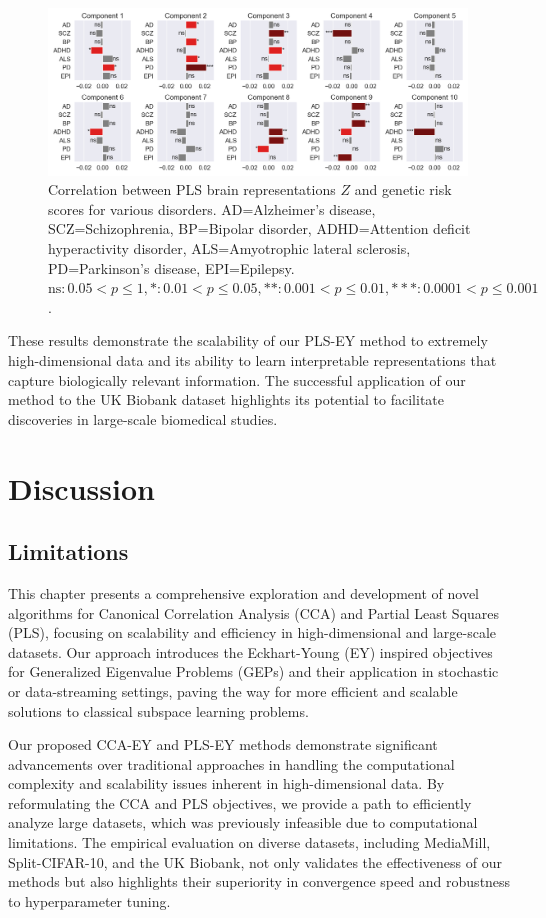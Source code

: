 \begin{figure}
\centering
\includegraphics[width=0.99\textwidth,trim={0.5cm 0cm 0.7cm 0cm}]{figures/UKBB/prs_correlations.png}
\caption{Correlation between PLS brain representations $Z$ and genetic risk scores for various disorders. AD=Alzheimer's disease, SCZ=Schizophrenia, BP=Bipolar disorder, ADHD=Attention deficit hyperactivity disorder, ALS=Amyotrophic lateral sclerosis, PD=Parkinson's disease, EPI=Epilepsy. $\text{ns}: 0.05 < p \leq 1, \ast: 0.01 < p \leq 0.05, \ast\ast: 0.001 < p \leq 0.01, \ast\ast\ast: 0.0001 < p \leq 0.001$.}
\label{fig:genetic_risk}
\end{figure}
These results demonstrate the scalability of our PLS-EY method to extremely high-dimensional data and its ability to learn interpretable representations that capture biologically relevant information. The successful application of our method to the UK Biobank dataset highlights its potential to facilitate discoveries in large-scale biomedical studies.

\section{Discussion}

\subsection{Limitations}

This chapter presents a comprehensive exploration and development of novel algorithms for Canonical Correlation Analysis (CCA) and Partial Least Squares (PLS), focusing on scalability and efficiency in high-dimensional and large-scale datasets.
Our approach introduces the Eckhart-Young (EY) inspired objectives for Generalized Eigenvalue Problems (GEPs) and their application in stochastic or data-streaming settings, paving the way for more efficient and scalable solutions to classical subspace learning problems.

Our proposed CCA-EY and PLS-EY methods demonstrate significant advancements over traditional approaches in handling the computational complexity and scalability issues inherent in high-dimensional data.
By reformulating the CCA and PLS objectives, we provide a path to efficiently analyze large datasets, which was previously infeasible due to computational limitations.
The empirical evaluation on diverse datasets, including MediaMill, Split-CIFAR-10, and the UK Biobank, not only validates the effectiveness of our methods but also highlights their superiority in convergence speed and robustness to hyperparameter tuning.

